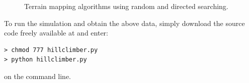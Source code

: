 \documentclass[english]{article}
\begin{document}
\begin{figure}
\hfill{}\protect\caption{Terrain mapping algorithms using random and directed searching.}
\end{figure}
To run the simulation and obtain the above data, simply download the
source code freely available at \cite{web1-1} and enter:

\begin{lstlisting}
> chmod 777 hillclimber.py
> python hillclimber.py
\end{lstlisting}
on the command line.
\end{document}
